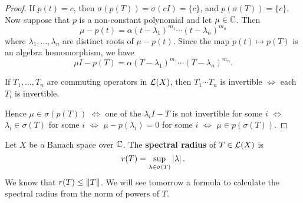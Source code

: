 \begin{proof}
  If $p(t)=c$, then $\sigma(p(T))=\sigma(cI) = \{c\}$, and $p(\sigma(T))=\{c\}$.
  Now suppose that $p$ is a non-constant polynomial and let $\mu \in \mathbb{C}$.
  Then
  \[ \mu-p(t) = \alpha(t-\lambda_1)^{m_1}\cdots(t-\lambda_n)^{m_n} \]
  where $\lambda_1,\ldots,\lambda_n$ are distinct roots of $\mu-p(t)$.
  Since the map $p(t) \mapsto p(T)$ is an algebra homomorphism, we have
  \[ \mu I-p(T) = \alpha(T-\lambda_1)^{m_1}\cdots(T-\lambda_n)^{m_n}. \]

  \begin{exer}
    If $T_1,\ldots,T_n$ are commuting operators in $\mathcal{L}(X)$, then $T_1 \cdots T_n$ is invertible $\iff$ each $T_i$ is invertible.
  \end{exer}

  Hence $\mu \in \sigma(p(T))$ $\iff$ one of the $\lambda_i I-T$ is not invertible for some $i$ $\iff$ $\lambda_i \in \sigma(T)$ for some $i$ $\iff$ $\mu-p(\lambda_i)=0$ for some $i$ $\iff$ $\mu \in p(\sigma(T))$.
\end{proof}

\begin{defn}
  Let $X$ be a Banach space over $\mathbb{C}$. The \textbf{spectral radius} of $T \in \mathcal{L}(X)$ is
  \[ r(T) = \sup_{\lambda\in\sigma(T)}\left\lvert \lambda \right\rvert. \]
  We know that $r(T) \leq \left\lVert T \right\rVert$.
  We will see tomorrow a formula to calculate the spectral radius from the norm of powers of $T$.
\end{defn}

